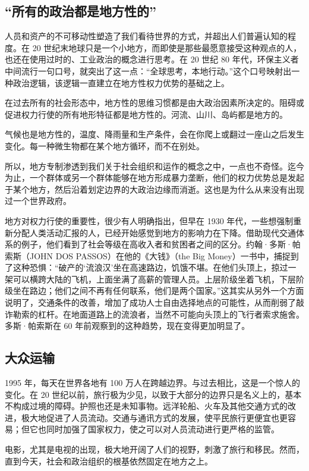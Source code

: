 \subsection{“所有的政治都是地方性的”}
人员和资产的不可移动性塑造了我们看待世界的方式，并超出人们普遍认知的程度。在 20 世纪末地球只是一个小地方，而即使是那些最愿意接受这种观点的人，也还在使用过时的、工业政治的概念进行思考。在 20 世纪 80 年代，环保主义者中间流行一句口号，就突出了这一点：“全球思考，本地行动。”这个口号映射出一种政治逻辑，该逻辑一直建立在地方性权力优势的基础之上。

在过去所有的社会形态中，地方性的思维习惯都是由大政治因素所决定的。阻碍或促进权力行使的所有地形特征都是地方性的。河流、山川、岛屿都是地方的。

气候也是地方性的，温度、降雨量和生产条件，会在你爬上或翻过一座山之后发生变化。每一种微生物都在某个地方循环，而不在别处。

所以，地方专制渗透到我们关于社会组织和运作的概念之中，一点也不奇怪。迄今为止，一个群体或另一个群体能够在地方形成暴力垄断，他们的权力优势总是发起于某个地方，然后沿着划定边界的大政治边缘而消逝。这也是为什么从来没有出现过一个世界政府。

地方对权力行使的重要性，很少有人明确指出，但早在 1930 年代，一些想强制重新分配人类活动汇报的人，已经开始感觉到地方的影响力在下降。借助现代交通体系的例子，他们看到了社会等级在高收入者和贫困者之间的区分。约翰·多斯·帕索斯（JOHN DOS PASSOS）在他的《大钱》（the Big Money）一书中，捕捉到了这种恐惧：“破产的‘流浪汉’坐在高速路边，饥饿不堪。在他们头顶上，掠过一架可以横跨大陆的飞机，上面坐满了高薪的管理人员。上层阶级坐着飞机，下层阶级坐在路边；他们之间不再有任何联系，他们是两个国家。”这其实从另外一个方面说明了，交通条件的改善，增加了成功人士自由选择地点的可能性，从而削弱了敲诈勒索的杠杆。在地面道路上的流浪者，当然不可能向头顶上的飞行者索求施舍。多斯·帕索斯在 60 年前观察到的这种趋势，现在变得更加明显了。

\subsection{大众运输}
1995 年，每天在世界各地有 100 万人在跨越边界。与过去相比，这是一个惊人的变化。在 20 世纪以前，旅行极为少见，以致于大部分的边界只是名义上的，基本不构成过境的障碍。护照也还是未知事物。远洋轮船、火车及其他交通方式的改进，极大地促进了人员流动。交通与通讯方式的发展，使平民旅行更便宜也更容易；但它也同时加强了国家权力，使之可以对人员流动进行更严格的监管。

电影，尤其是电视的出现，极大地开阔了人们的视野，刺激了旅行和移民。然而，直到今天，社会和政治组织的根基依然固定在地方之上。


